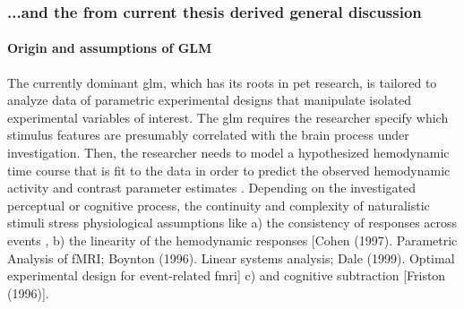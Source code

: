 \subsubsection{...and the from current thesis derived general discussion}


\paragraph{Origin and assumptions of GLM}


%
The currently dominant \ac{glm}, which has its roots in \ac{pet} research, is
tailored to analyze data of parametric experimental designs that
manipulate isolated experimental variables of interest.
%
The \ac{glm} requires the researcher specify which stimulus features are
presumably correlated with the brain process under investigation.
%
Then, the researcher needs to model a hypothesized hemodynamic time course that
is fit to the data in order to predict the observed hemodynamic activity and
contrast parameter estimates \citep{friston1998event}.
%
Depending on the investigated perceptual or cognitive process, the continuity
and complexity of naturalistic stimuli stress physiological assumptions like
%
a) the consistency of responses across events \citep[the rationale behind
\textit{trial-averaging};][]{dale1997selective},
%
b) the linearity of the hemodynamic responses [Cohen (1997). Parametric Analysis
of fMRI; Boynton (1996). Linear systems analysis; Dale (1999). Optimal
experimental design for event-related fmri]
%
c) and cognitive subtraction [Friston (1996)].


